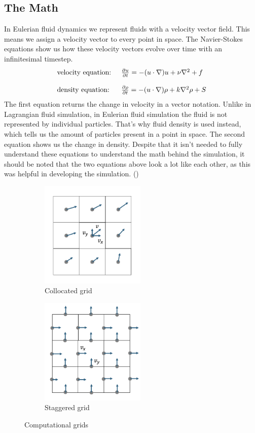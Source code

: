 \documentclass[a4paper,12pt,titlepage]{article}
\begin{document}
\subsection{The Math} \label{math}
In Eulerian fluid dynamics we represent fluids with a velocity vector field. This means we assign a velocity vector to every point in space.
The Navier-Stokes equations show us how these velocity vectors evolve over time with an infinitesimal timestep.
\[
	\begin{array}{ll}
		\text{velocity equation: } & \pdv{u}{t} = -(u \cdot \nabla)u + \nu\nabla^2 + f \\
		\\
		\text{density equation: } & \pdv{\rho}{t} = -(u \cdot \nabla)\rho + k\nabla^2\rho + S
	\end{array}
\]
The first equation returns the change in velocity in a vector notation. 
Unlike in Lagrangian fluid simulation, in Eulerian fluid simulation the fluid is not represented by individual particles. 
That's why fluid density is used instead, which tells us the amount of particles present in a point in space. 
The second equation shows us the change in density. 
Despite that it isn't needed to fully understand these equations to understand
the math behind the simulation, it should be noted that the two equations above look
a lot like each other, as this was helpful in developing the simulation. (\cite{josstam})

\begin{figure}[H]
	\centering
	\begin{subfigure}[t]{0.45\textwidth}
		\centering
		\includegraphics[width=5cm]{resources/collocated_grid_2.png}
		\caption{Collocated grid}
	\end{subfigure}
	\hfill
	\begin{subfigure}[t]{0.45\textwidth}
		\centering
		\includegraphics[width=5cm]{resources/staggered_grid_2.png}
		\caption{Staggered grid}
	\end{subfigure}
	\caption{Computational grids}
\end{figure}
\end{document}
